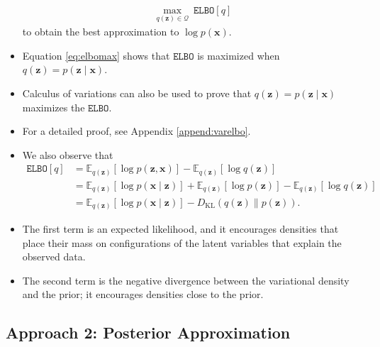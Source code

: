 \documentclass[10pt]{article}
\newcommand{\EE}{\mathbb{E}}
\newcommand{\QQ}{\mathcal{Q}}
\newcommand{\elbo}{\texttt{ELBO}}
\newcommand{\KL}{D_{\text{KL}}}
\begin{document}
\begin{itemize}
\begin{align*}
\max_{q(\bm{z}) \in \QQ} \ \elbo[q]
\end{align*}
to obtain the best approximation to $\log p(\bm{x})$.
\item Equation \eqref{eq:elbomax} shows that $\elbo$ is maximized when $q(\bm{z}) = p(\bm{z} \mid \bm{x})$.
\item Calculus of variations can also be used to prove that $q(\bm{z}) = p(\bm{z} \mid \bm{x})$ maximizes the $\elbo$.
\item For a detailed proof, see Appendix \ref{append:varelbo}.
\item We also observe that
\begin{align} \label{eq:elbo2}
\elbo[q] &= \EE_{q(\bm{z})} [ \log p(\bm{z},\bm{x}) ] - \EE_{q(\bm{z})} [\log q(\bm{z})] \nonumber \\
&= \EE_{q(\bm{z})}[\log p(\bm{x} \mid \bm{z})] + \EE_{q(\bm{z})}[ \log p(\bm{z}) ] - \EE_{q(\bm{z})} [\log q(\bm{z})] \nonumber \\
&= \EE_{q(\bm{z})}[\log p(\bm{x} \mid \bm{z})] - \KL(q(\bm{z}) \| p(\bm{z})).
\end{align}
\item The first term is an expected likelihood, and it encourages densities that place their mass on configurations of the latent variables that explain the observed data.
\item The second term is the negative divergence between the variational density and the prior; it encourages densities close to the prior.
\end{itemize}

\subsection{Approach 2: Posterior Approximation}
\end{document}
